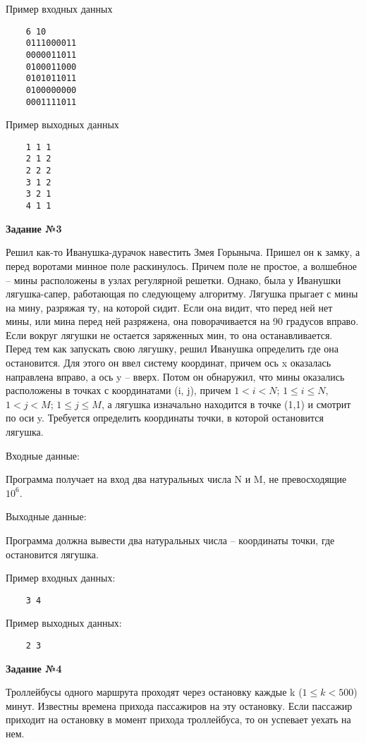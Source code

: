 Пример входных данных
\begin{verbatim}
    6 10
    0111000011
    0000011011
    0100011000
    0101011011
    0100000000
    0001111011
\end{verbatim}

Пример выходных данных
\begin{verbatim}
    1 1 1
    2 1 2
    2 2 2
    3 1 2
    3 2 1
    4 1 1
\end{verbatim}

{\bf Задание №3}

Решил как-то Иванушка-дурачок навестить Змея Горыныча. Пришел он к замку, а перед воротами минное поле раскинулось. Причем поле не простое, а волшебное – мины расположены в узлах регулярной решетки. 
Однако, была у Иванушки лягушка-сапер, работающая по следующему алгоритму. Лягушка прыгает с мины на мину, разряжая ту, на которой сидит. Если она видит, что перед ней нет мины, или мина перед ней разряжена, 
она поворачивается на 90 градусов вправо. Если вокруг лягушки не остается заряженных мин, то она останавливается. Перед тем как запускать свою лягушку, решил Иванушка определить где она остановится. 
Для этого он ввел систему координат, причем ось x оказалась направлена вправо, а ось y – вверх. Потом он обнаружил, что мины оказались расположены в точках с координатами (i, j), причем $1 < i < N$; $1 \le i \le N$, $1 < j < M$; $1 \le j \le M$, 
а лягушка изначально находится в точке (1,1) и смотрит по оси y. Требуется определить координаты точки, в которой остановится лягушка.

Входные данные:

Программа получает на вход два натуральных числа N и M, не превосходящие $10^6$.

Выходные данные:

Программа должна вывести два натуральных числа – координаты точки, где остановится лягушка.

Пример входных данных:
\begin{verbatim}
    3 4
\end{verbatim}

Пример выходных данных:
\begin{verbatim}
    2 3
\end{verbatim}


{\bf Задание №4}

Троллейбусы одного маршрута проходят через остановку каждые k ($1 \le k<500$) минут. Известны времена прихода пассажиров на эту остановку. Если пассажир приходит на остановку в момент прихода троллейбуса, то он успевает уехать на нем.

